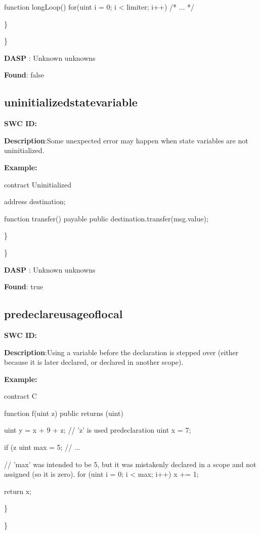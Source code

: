 \documentclass{article}
\begin{document}
{{    function longLoop() {
        for(uint i = 0; i < limiter; i++) {
            /* ... */
        }
    }
}

\} 

\} 

\textbf{DASP} : Unknown unknowns

\textbf{Found}: false

\subsection{uninitialized\textunderscore state\textunderscore variable} 
\textbf{SWC \textunderscore ID:} 

\textbf{Description}:Some unexpected error may happen when state variables are not uninitialized.


\textbf{Example:} 

contract Uninitialized{
    address destination;

    function transfer() payable public{
        destination.transfer(msg.value);
    }
}

\} 

\} 

\textbf{DASP} : Unknown unknowns

\textbf{Found}: true

\subsection{pre\textendash declare\textunderscore usage\textunderscore of\textunderscore local} 
\textbf{SWC \textunderscore ID:} 

\textbf{Description}:Using a variable before the declaration is stepped over (either because it is later declared, or declared in another scope).


\textbf{Example:} 

contract C {
    function f(uint z) public returns (uint) {
        uint y = x + 9 + z; // 'z' is used pre\textendash declaration
        uint x = 7;

        if (z %
            uint max = 5;
            // ...
        }

        // 'max' was intended to be 5, but it was mistakenly declared in a scope and not assigned (so it is zero).
        for (uint i = 0; i < max; i++) {
            x += 1;
        }

        return x;
    }
}

\} 

\} 
\end{document}
